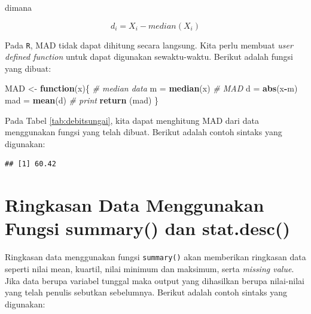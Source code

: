 \documentclass[]{book}
\newenvironment{Shaded}{\begin{snugshade}}{\end{snugshade}}
\newcommand{\KeywordTok}[1]{\textcolor[rgb]{0.13,0.29,0.53}{\textbf{#1}}}
\newcommand{\StringTok}[1]{\textcolor[rgb]{0.31,0.60,0.02}{#1}}
\newcommand{\CommentTok}[1]{\textcolor[rgb]{0.56,0.35,0.01}{\textit{#1}}}
\newcommand{\ControlFlowTok}[1]{\textcolor[rgb]{0.13,0.29,0.53}{\textbf{#1}}}
\newcommand{\OperatorTok}[1]{\textcolor[rgb]{0.81,0.36,0.00}{\textbf{#1}}}
\newcommand{\NormalTok}[1]{#1}
\begin{document}
dimana

\begin{equation}
  d_i=X_i-median\left(X_i\right)
  \label{eq:mad2}
\end{equation}

Pada \texttt{R}, MAD tidak dapat dihitung secara langsung. Kita perlu
membuat \emph{user defined function} untuk dapat digunakan
sewaktu-waktu. Berikut adalah fungsi yang dibuat:

\begin{Shaded}
\begin{Highlighting}[]
\NormalTok{MAD <-}\StringTok{ }\ControlFlowTok{function}\NormalTok{(x)\{}
  \CommentTok{# median data}
\NormalTok{  m =}\StringTok{ }\KeywordTok{median}\NormalTok{(x)}
  \CommentTok{# MAD}
\NormalTok{  d =}\StringTok{ }\KeywordTok{abs}\NormalTok{(x}\OperatorTok{-}\NormalTok{m)}
\NormalTok{  mad =}\StringTok{ }\KeywordTok{mean}\NormalTok{(d)}
  \CommentTok{# print}
  \KeywordTok{return}\NormalTok{ (mad)}
\NormalTok{\}}
\end{Highlighting}
\end{Shaded}

Pada Tabel \ref{tab:debitsungai}, kita dapat menghitung MAD dari data
menggunakan fungsi yang telah dibuat. Berikut adalah contoh sintaks yang
digunakan:

\begin{Shaded}
\end{Shaded}

\begin{verbatim}
## [1] 60.42
\end{verbatim}

\section{Ringkasan Data Menggunakan Fungsi summary() dan
stat.desc()}\label{ringkasan-data-menggunakan-fungsi-summary-dan-stat.desc}

Ringkasan data menggunakan fungsi \texttt{summary()} akan memberikan
ringkasan data seperti nilai mean, kuartil, nilai minimum dan maksimum,
serta \emph{missing value}. Jika data berupa variabel tunggal maka
output yang dihasilkan berupa nilai-nilai yang telah penulis sebutkan
sebelumnya. Berikut adalah contoh sintaks yang digunakan:

\begin{Shaded}
\end{Shaded}
\end{document}
